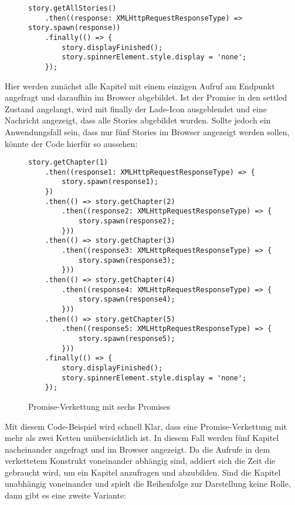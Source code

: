 \begin{figure}[H]
\begin{lstlisting}
story.getAllStories()
    .then((response: XMLHttpRequestResponseType) => story.spawn(response))
    .finally(() => {
        story.displayFinished();
        story.spinnerElement.style.display = 'none';
    });
\end{lstlisting}
\end{figure}

\noindent
Hier werden zunächst alle Kapitel mit einem einzigen Aufruf am Endpunkt angefragt und daraufhin im Browser abgebildet. Ist der Promise in den settled Zustand angelangt, wird mit finally der Lade-Icon ausgeblendet und eine Nachricht angezeigt, dass alle Stories abgebildet wurden. Sollte jedoch ein Anwendungsfall sein, dass nur fünf Stories im Browser angezeigt werden sollen, könnte der Code hierfür so aussehen: 

\begin{figure}[H]
\begin{lstlisting}
story.getChapter(1)
    .then((response1: XMLHttpRequestResponseType) => {
        story.spawn(response1);
    })
    .then(() => story.getChapter(2)
        .then((response2: XMLHttpRequestResponseType) => {
            story.spawn(response2);
        }))
    .then(() => story.getChapter(3)
        .then((response3: XMLHttpRequestResponseType) => {
            story.spawn(response3);
        }))
    .then(() => story.getChapter(4)
        .then((response4: XMLHttpRequestResponseType) => {
            story.spawn(response4);
        }))
    .then(() => story.getChapter(5)
        .then((response5: XMLHttpRequestResponseType) => {
            story.spawn(response5);
        }))
    .finally(() => {
        story.displayFinished();
        story.spinnerElement.style.display = 'none';
    });
\end{lstlisting}
\caption{Promise-Verkettung mit sechs Promises}
\end{figure}

\noindent
Mit diesem Code-Beispiel wird schnell Klar, dass eine Promise-Verkettung mit mehr als zwei Ketten unübersichtlich ist. In diesem Fall werden fünf Kapitel nacheinander angefragt und im Browser angezeigt. Da die Aufrufe in dem verkettetem Konstrukt voneinander abhängig sind, addiert sich die Zeit die gebraucht wird, um ein Kapitel anzufragen und abzubilden. Sind die Kapitel unabhängig voneinander und spielt die Reihenfolge zur Darstellung keine Rolle, dann gibt es eine zweite Variante: 

